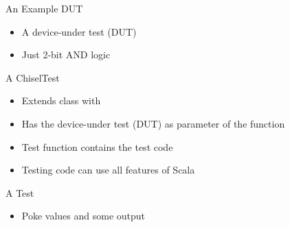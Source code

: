 \begin{frame}[fragile]{An Example DUT}
\begin{itemize}
\item A device-under test (DUT)
\item Just 2-bit AND logic
\end{itemize}
\end{frame}

\begin{frame}[fragile]{A ChiselTest}
\begin{itemize}
\item Extends class  with 
\item Has the device-under test (DUT) as parameter of the  function
\item Test function contains the test code
\item Testing code can use all features of Scala
\end{itemize}
\end{frame}



\begin{frame}[fragile]{A Test}
\begin{itemize}
\item Poke values and  some output
\end{itemize}
\end{frame}

%


